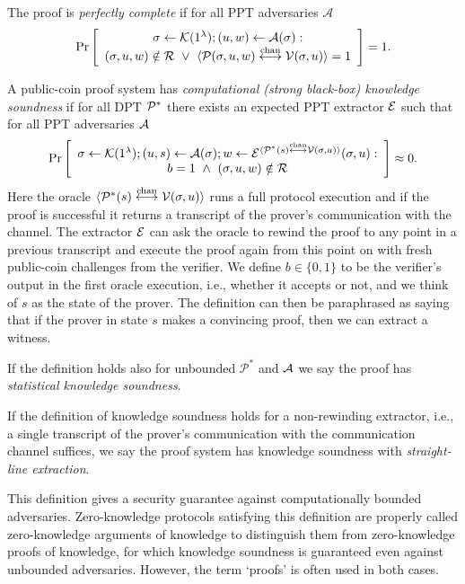 \begin{definition}
The proof is \emph{perfectly complete} if for all PPT adversaries $\mathcal{A}$
$$\Pr \left[ \begin{array}{c} \mathsf{\sigma}\gets \mathcal{K}(1^{\lambda}); (u,w) \leftarrow \mathcal{A}(\mathsf{\sigma}): \\
(\mathsf{\sigma},u,w)\notin \mathcal{R} ~\vee~ \langle \mathcal{P}(\mathsf{\sigma},u,w)\overset{\textnormal{chan}}{\longleftrightarrow}\mathcal{V}(\mathsf{\sigma},u)\rangle=1 \end{array}\right] =1.$$
\end{definition}

\begin{definition}
A public-coin proof system has \emph{computational (strong black-box) knowledge soundness} if for all DPT $\mathcal{P}^*$ there exists an expected PPT extractor $\mathcal{E}$ such that for all PPT adversaries $\mathcal{A}$
$$\Pr\left[\begin{array}{c} \mathsf{\sigma}\gets \mathcal{K}(1^{\lambda});(u,s) \gets \mathcal{A}(\mathsf{\sigma}); w\gets \mathcal{E}^{\langle \mathcal{P}^*(s)\overset{\textnormal{chan}}{\longleftrightarrow}\mathcal{V}(\mathsf{\sigma},u)\rangle}(\mathsf{\sigma},u):\\ b=1 ~\wedge~ (\mathsf{\sigma},u,w)\notin \mathcal{R} \end{array}\right]\approx 0.$$ 
Here the oracle $\langle \mathcal{P}^*(s)\overset{\textnormal{chan}}{\longleftrightarrow}\mathcal{V}(\mathsf{\sigma},u)\rangle$ runs a full protocol execution and if the proof is successful it returns a transcript of the prover's communication with the channel. The extractor $\mathcal{E}$ can ask the oracle to rewind the proof to any point in a previous transcript and execute the proof again from this point on with fresh public-coin challenges from the verifier. We define $b\in \{0,1\}$ to be the verifier's output in the first oracle execution, i.e., whether it accepts or not, and we think of $s$ as the state of the prover. The definition can then be paraphrased as saying that if the prover in state $s$ makes a convincing proof, then we can extract a witness.

If the definition holds also for unbounded $\mathcal{P}^*$ and $\mathcal{A}$ we say the proof has {\em statistical knowledge soundness}. 

If the definition of knowledge soundness holds for a non-rewinding extractor, i.e., a single transcript of the prover's communication with the communication channel suffices, we say the proof system has knowledge soundness with {\em straight-line extraction}. 
\end{definition}
\noindent
This definition gives a security guarantee against computationally bounded adversaries. Zero-knowledge protocols satisfying this definition are properly called zero-knowledge arguments of knowledge to distinguish them from zero-knowledge proofs of knowledge, for which knowledge soundness is guaranteed even against unbounded adversaries. However, the term `proofs' is often used in both cases.

